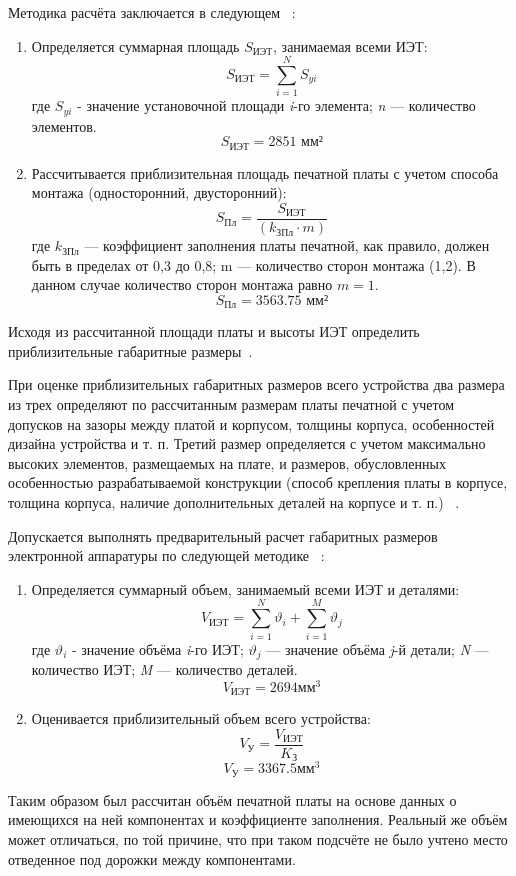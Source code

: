 Методика расчёта заключается в следующем ~\cite{Kostukevich2012}:
\begin{enumerate}
\item Определяется суммарная площадь $S_{\text{ИЭТ}}$, занимаемая всеми ИЭТ:
  \begin{equation}
    S_{\text{ИЭТ}} = \sum^N_{i=1}S_{yi}
  \end{equation}
  где $S_{yi}$ - значение установочной площади \textit{i}-го элемента;
  \textit{n} —  количество элементов.
%
  $$ S_{\text{ИЭТ}}= 2851 \text{ мм²}$$
%
\item Рассчитывается приблизительная площадь печатной платы с учетом
  способа монтажа (односторонний, двусторонний):
  \begin{equation}
    S_{\text{Пл}} = \frac{S_{\text{ИЭТ}}}{(k_{\text{ЗПл}} \cdot m)}
  \end{equation}
  где $k_{\text{ЗПл}}$ — коэффициент заполнения платы печатной, как правило,
  должен быть в пределах от 0,3 до 0,8;
  m — количество сторон монтажа (1,2).
  В данном случае количество сторон монтажа равно $m=1$.
  $$S_{\text{Пл}} = 3563.75 \text{ мм²}$$
\end{enumerate}


Исходя из рассчитанной площади платы и высоты ИЭТ определить
приблизительные габаритные размеры~\cite{Kostukevich2012}.

При оценке приблизительных габаритных размеров всего устройства два
размера из трех определяют по рассчитанным размерам платы печатной с
учетом допусков на зазоры между платой и корпусом, толщины корпуса,
особенностей дизайна устройства и т. п.
Третий размер определяется с учетом максимально высоких элементов,
размещаемых на плате, и размеров, обусловленных особенностью
разрабатываемой конструкции (способ крепления платы в корпусе,
толщина корпуса, наличие дополнительных деталей на корпусе и т. п.) ~\cite{Kostukevich2012}.

Допускается выполнять предварительный расчет габаритных размеров
электронной аппаратуры по следующей методике ~\cite{Kostukevich2012}:
\begin{enumerate}
\item Определяется суммарный объем, занимаемый всеми ИЭТ и деталями:
  \begin{equation}
    V_{\textit{ИЭТ}} = \sum^N_{i=1}\vartheta_i +   \sum^M_{i=1}\vartheta_j
  \end{equation}
%
где $\vartheta_i$ - значение объёма \textit{i}-го ИЭТ;
$\vartheta_j$ — значение объёма \textit{j}-й детали;
\textit{N} — количество ИЭТ;
\textit{M} — количество деталей.
%
$$V_{\textit{ИЭТ}} =  2694 \text{мм}^3$$
\item Оценивается приблизительный объем всего устройства:
  \begin{equation}
    V_{\text{У}} = \frac{V_{\text{ИЭТ}}}{K_{\text{З}}}
  \end{equation}
%
  $$V_{\text{У}} =3367.5 \text{мм}^3$$
%
\end{enumerate}
%
Таким образом был рассчитан объём печатной платы на основе данных о
имеющихся на ней компонентах и коэффициенте заполнения.
Реальный же объём может отличаться, по той причине, что при таком
подсчёте не было учтено место отведенное под дорожки между
компонентами.

